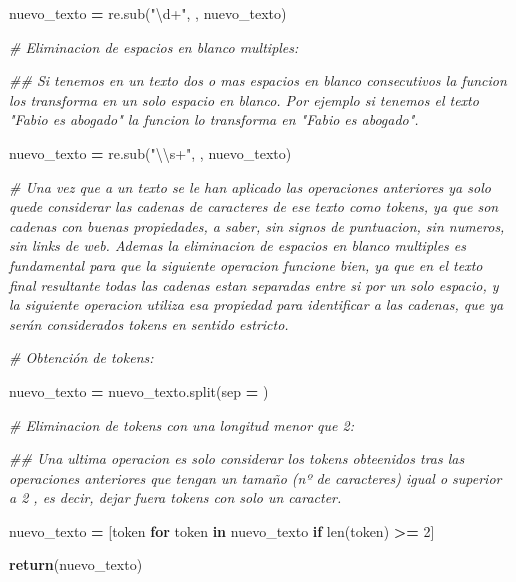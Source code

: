 \documentclass[
  11pt,
  a4paper,
]{article}
\newenvironment{Shaded}{\begin{snugshade}}{\end{snugshade}}
\newcommand{\BuiltInTok}[1]{#1}
\newcommand{\CharTok}[1]{\textcolor[rgb]{0.31,0.60,0.02}{#1}}
\newcommand{\CommentTok}[1]{\textcolor[rgb]{0.56,0.35,0.01}{\textit{#1}}}
\newcommand{\ControlFlowTok}[1]{\textcolor[rgb]{0.13,0.29,0.53}{\textbf{#1}}}
\newcommand{\DecValTok}[1]{\textcolor[rgb]{0.00,0.00,0.81}{#1}}
\newcommand{\KeywordTok}[1]{\textcolor[rgb]{0.13,0.29,0.53}{\textbf{#1}}}
\newcommand{\NormalTok}[1]{#1}
\newcommand{\OperatorTok}[1]{\textcolor[rgb]{0.81,0.36,0.00}{\textbf{#1}}}
\newcommand{\StringTok}[1]{\textcolor[rgb]{0.31,0.60,0.02}{#1}}
\begin{document}
\begin{Shaded}
\begin{Highlighting}[]
\NormalTok{    nuevo\_texto }\OperatorTok{=}\NormalTok{ re.sub(}\StringTok{"\textbackslash{}d+"}\NormalTok{, }\StringTok{\textquotesingle{} \textquotesingle{}}\NormalTok{, nuevo\_texto)}
    
    
    
    \CommentTok{\# Eliminacion de espacios en blanco multiples:}
    
    \CommentTok{\#\# Si tenemos en un texto dos o mas espacios en blanco consecutivos la funcion los transforma en un solo espacio en blanco. Por ejemplo si tenemos el texto "Fabio     es abogado" la funcion lo transforma en "Fabio es abogado".}
    
\NormalTok{    nuevo\_texto }\OperatorTok{=}\NormalTok{ re.sub(}\StringTok{"}\CharTok{\textbackslash{}\textbackslash{}}\StringTok{s+"}\NormalTok{, }\StringTok{\textquotesingle{} \textquotesingle{}}\NormalTok{, nuevo\_texto)}
    
    
    \CommentTok{\# Una vez que a un texto se le han aplicado las operaciones anteriores ya solo quede considerar las cadenas de caracteres de ese texto como tokens, ya que son cadenas con buenas propiedades, a saber, sin signos de puntuacion, sin numeros, sin links de web. Ademas la eliminacion de espacios en blanco multiples es fundamental para que la siguiente operacion funcione bien, ya que en el texto final resultante todas las cadenas estan separadas entre si por un solo espacio, y la siguiente operacion utiliza esa propiedad para identificar a las cadenas, que ya serán considerados tokens en sentido estricto.}
    
    \CommentTok{\# Obtención de tokens:}
    
\NormalTok{    nuevo\_texto }\OperatorTok{=}\NormalTok{ nuevo\_texto.split(sep }\OperatorTok{=} \StringTok{\textquotesingle{} \textquotesingle{}}\NormalTok{)}
    
    
    \CommentTok{\# Eliminacion de tokens con una longitud menor que  2:}
    
    \CommentTok{\#\# Una ultima operacion es solo considerar los tokens obteenidos tras las operaciones anteriores que tengan un tamaño (nº de caracteres) igual o superior a 2 , es decir, dejar fuera tokens con solo un caracter.}
    
\NormalTok{    nuevo\_texto }\OperatorTok{=}\NormalTok{ [token }\ControlFlowTok{for}\NormalTok{ token }\KeywordTok{in}\NormalTok{ nuevo\_texto }\ControlFlowTok{if} \BuiltInTok{len}\NormalTok{(token) }\OperatorTok{\textgreater{}=}  \DecValTok{2}\NormalTok{]}
    
    \ControlFlowTok{return}\NormalTok{(nuevo\_texto)}
\end{Highlighting}
\end{Shaded}
\end{document}
